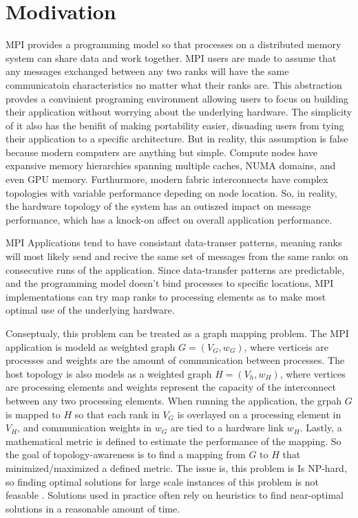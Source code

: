 \section{Modivation}
MPI provides a programming model so that processes on a distributed memory system can share data and work together.
MPI users are made to assume that any messages exchanged between any two ranks will have the same communicatoin characteristics no matter what their ranks are. 
This abstraction provdes a convinient programing environment allowing users to focus on building their application without worrying about the underlying hardware. 
The simplicity of it also has the benifit of making portability easier, disuading users from tying their application to a specific architecture.
But in reality, this assumption is false because modern computers are anything but simple. 
Compute nodes have expansive memory hierarchies spanning multiple caches, NUMA domains, and even GPU memory.
Furthurmore, modern fabric interconnects have complex topologies with variable performance depeding on node location.
So, in reality, the hardware topology of the system has an outiszed impact on message performance, which has a knock-on affect on overall application performance. 

MPI Applications tend to have consistant data-transer patterns, meaning ranks will most likely send and recive the same set of messages from the same ranks on consecutive runs of the application.
Since data-transfer patterns are predictable, and the programming model doesn't bind processes to specific locations, MPI implementations can try map ranks to processing elements as to make most optimal use of the underlying hardware.

Conseptualy, this problem can be treated as a graph mapping problem. 
The MPI application is modeld as weighted graph $G=(V_G, w_G)$, where verticeis are processes and weights are the amount of communication between processes.
The host topology is also models as a weighted graph $H=(V_h, w_H)$, where vertices are processing elements and weights represent the capacity of the interconnect between any two processing elements.
When running the application, the grpah $G$ is mapped to $H$ so that each rank in $V_G$ is overlayed on a processing element in $V_H$, and communication weights in $w_G$ are tied to a hardware link $w_H$.
Lastly, a mathematical metric is defined to estimate the performance of the mapping.
So the goal of topology-awareness is to find a mapping from $G$ to $H$ that minimized/maximized a defined metric.
The issue is, this problem is Is NP-hard, so finding optimal solutions for large scale instances of this problem is not feasable \cite{Hoefler2011GenericTopoMappingStrats}.
Solutions used in practice often rely on heuristics to find near-optimal solutions in a reasonable amount of time.

